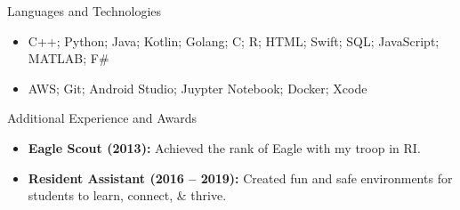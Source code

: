 \documentclass[]{mcdowellcv}
\begin{document}
	\begin{cvsection}{Languages and Technologies}
		\begin{cvsubsection}{}{}{}	
			\begin{itemize}
				\item C++; Python; Java; Kotlin; Golang; C; R; HTML; Swift; SQL; JavaScript; MATLAB; F\#
				\item AWS; Git; Android Studio; Juypter Notebook; Docker; Xcode
			\end{itemize}
		\end{cvsubsection}
	\end{cvsection}

	\begin{cvsection}{Additional Experience and Awards}
		\begin{cvsubsection}{}{}{}	
			\begin{itemize}
				\item \textbf{Eagle Scout (2013):} Achieved the rank of Eagle with my troop in RI.
				\item \textbf{Resident Assistant (2016 -- 2019):} Created fun and safe environments for students to learn, connect, \& thrive.
			\end{itemize}
		\end{cvsubsection}
	\end{cvsection}
		
\end{document}

